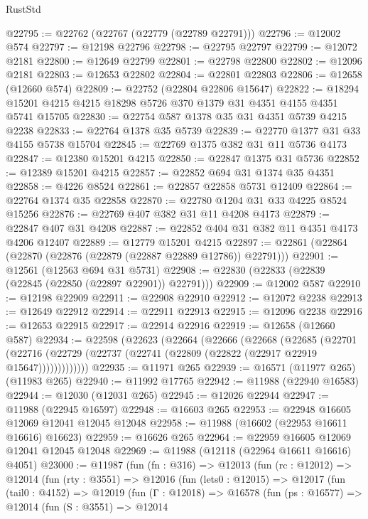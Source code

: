 \begin{lexlean}{RustStd}
\begin{coremodule}
@22795 := @22762 (@22767 (@22779 (@22789 @22791)))
@22796 := @12002 @574
@22797 := @12198 @22796
@22798 := @22795 @22797
@22799 := @12072 @2181
@22800 := @12649 @22799
@22801 := @22798 @22800
@22802 := @12096 @2181
@22803 := @12653 @22802
@22804 := @22801 @22803
@22806 := @12658 (@12660 @574)
@22809 := @22752 (@22804 @22806 @15647)
@22822 := @18294 @15201 @4215 @4215 @18298 @5726 @370 @1379 @31 @4351 @4155 @4351 @5741 @15705
@22830 := @22754 @587 @1378 @35 @31 @4351 @5739 @4215 @2238
@22833 := @22764 @1378 @35 @5739
@22839 := @22770 @1377 @31 @33 @4155 @5738 @15704
@22845 := @22769 @1375 @382 @31 @11 @5736 @4173
@22847 := @12380 @15201 @4215
@22850 := @22847 @1375 @31 @5736
@22852 := @12389 @15201 @4215
@22857 := @22852 @694 @31 @1374 @35 @4351
@22858 := @4226 @8524
@22861 := @22857 @22858 @5731 @12409
@22864 := @22764 @1374 @35 @22858
@22870 := @22780 @1204 @31 @33 @4225 @8524 @15256
@22876 := @22769 @407 @382 @31 @11 @4208 @4173
@22879 := @22847 @407 @31 @4208
@22887 := @22852 @404 @31 @382 @11 @4351 @4173 @4206 @12407
@22889 := @12779 @15201 @4215
@22897 := @22861 (@22864 (@22870 (@22876 (@22879 (@22887 @22889 @12786)) @22791)))
@22901 := @12561 (@12563 @694 @31 @5731)
@22908 := @22830 (@22833 (@22839 (@22845 (@22850 (@22897 @22901)) @22791)))
@22909 := @12002 @587
@22910 := @12198 @22909
@22911 := @22908 @22910
@22912 := @12072 @2238
@22913 := @12649 @22912
@22914 := @22911 @22913
@22915 := @12096 @2238
@22916 := @12653 @22915
@22917 := @22914 @22916
@22919 := @12658 (@12660 @587)
@22934 := @22598
    (@22623
      (@22664
        (@22666
          (@22668
            (@22685
              (@22701
                (@22716 (@22729 (@22737 (@22741 (@22809 (@22822 (@22917 @22919 @15647)))))))))))))
@22935 := @11971 @265
@22939 := @16571 (@11977 @265) (@11983 @265)
@22940 := @11992 @17765
@22942 := @11988 (@22940 @16583)
@22944 := @12030 (@12031 @265)
@22945 := @12026 @22944
@22947 := @11988 (@22945 @16597)
@22948 := @16603 @265
@22953 := @22948 @16605 @12069 @12041 @12045 @12048
@22958 := @11988 (@16602 (@22953 @16611 @16616) @16623)
@22959 := @16626 @265
@22964 := @22959 @16605 @12069 @12041 @12045 @12048
@22969 := @11988 (@12118 (@22964 @16611 @16616) @4051)
@23000 := @11987
    (fun (fn : @316) =>
    @12013
      (fun (rc : @12012) =>
      @12014
        (fun (rty : @3551) =>
        @12016
          (fun (lets0 : @12015) =>
          @12017
            (fun (tail0 : @4152) =>
            @12019
              (fun (Γ : @12018) =>
              @16578
                (fun (ps : @16577) =>
                @12014
                  (fun (S : @3551) =>
                  @12014

\end{coremodule}
\end{lexlean}
